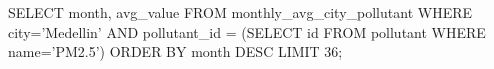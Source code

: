 SELECT month, avg_value
FROM monthly_avg_city_pollutant
WHERE city='Medellin' AND pollutant_id = (SELECT id FROM pollutant 
                                            WHERE name='PM2.5')
ORDER BY month DESC LIMIT 36;
